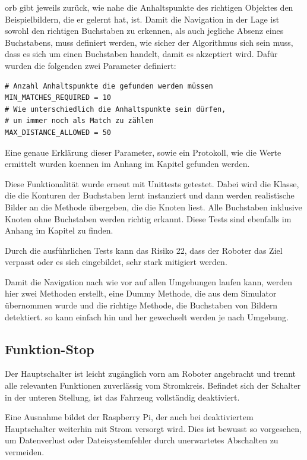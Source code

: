 \acrshort{orb} gibt jeweils zurück, wie nahe die Anhaltspunkte des richtigen Objektes den Beispielbildern, die er gelernt hat, ist. Damit die Navigation in der Lage ist sowohl den richtigen Buchstaben zu erkennen, als auch jegliche Absenz eines Buchstabens, muss definiert werden, wie sicher der Algorithmus sich sein muss, dass es sich um einen Buchstaben handelt, damit es akzeptiert wird. Dafür wurden die folgenden zwei Parameter definiert:
\begin{verbatim}
# Anzahl Anhaltspunkte die gefunden werden müssen
MIN_MATCHES_REQUIRED = 10
# Wie unterschiedlich die Anhaltspunkte sein dürfen,
# um immer noch als Match zu zählen
MAX_DISTANCE_ALLOWED = 50
\end{verbatim}

Eine genaue Erklärung dieser Parameter, sowie ein Protokoll, wie die Werte ermittelt wurden koennen im Anhang im Kapitel  gefunden werden.

Diese Funktionalität wurde erneut mit Unittests getestet.
Dabei wird die Klasse, die die Konturen der Buchstaben lernt instanziert und dann werden realistische Bilder an die Methode übergeben, die die Knoten liest. Alle Buchstaben inklusive Knoten ohne Buchstaben werden richtig erkannt. Diese Tests sind ebenfalls im Anhang im Kapitel  zu finden.

Durch die ausführlichen Tests kann das Risiko 22, dass der Roboter das Ziel verpasst oder es sich eingebildet, sehr stark mitigiert werden.

Damit die Navigation nach wie vor auf allen Umgebungen laufen kann, werden hier zwei Methoden erstellt, eine Dummy Methode, die aus dem Simulator übernommen wurde und die richtige Methode, die Buchstaben von Bildern detektiert. so kann einfach hin und her gewechselt werden je nach Umgebung.


\newpage
\subsection{Funktion-Stop}


Der Hauptschalter ist leicht zugänglich vorn am Roboter angebracht und trennt alle  relevanten Funktionen zuverlässig vom Stromkreis. Befindet sich der Schalter in der unteren Stellung, ist das Fahrzeug vollständig deaktiviert.

Eine Ausnahme bildet der Raspberry Pi, der auch bei deaktiviertem Hauptschalter weiterhin mit Strom versorgt wird. Dies ist bewusst so vorgesehen, um Datenverlust oder Dateisystemfehler durch unerwartetes Abschalten zu vermeiden.

